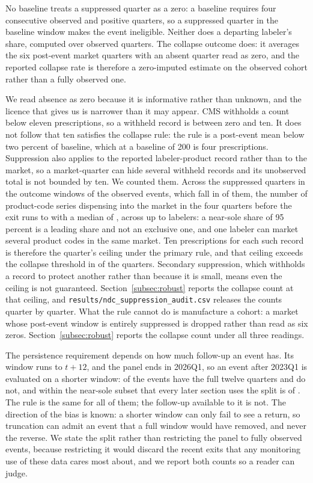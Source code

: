 \documentclass[pdflatex,sn-vancouver-num,Numbered]{sn-jnl}
\begin{document}
No baseline treats a suppressed quarter as a zero: a baseline requires four consecutive observed
and positive quarters, so a suppressed quarter in the baseline window makes the event
ineligible. Neither does a departing labeler's share, computed over observed quarters. The
collapse outcome does: it averages the six post-event market quarters with an absent quarter read
as zero, and the reported collapse rate is therefore a zero-imputed estimate on the observed
cohort rather than a fully observed one.

We read absence as zero because it is informative rather than unknown, and the licence that gives
us is narrower than it may appear. CMS withholds a count below eleven prescriptions, so a
withheld record is between zero and ten. It does not follow that ten satisfies the collapse rule:
the rule is a post-event mean below two percent of baseline, which at a baseline of 200 is four
prescriptions. Suppression also applies to the reported labeler-product record rather than to the
market, so a market-quarter can hide several withheld records and its unobserved total is not
bounded by ten. We counted them. Across the \nSuppQuarters suppressed quarters in the outcome
windows of the \nCauseTotal observed events, which fall in \nSuppEvents of them, the number of
product-code series dispensing into the market in the four quarters before the exit runs to
\nSuppCellsMax with a median of \nSuppCellsMed, across up to \nSuppLabsMax labelers: a near-sole
share of 95 percent is a leading share and not an exclusive one, and one labeler can market
several product codes in the same market. Ten prescriptions for each such record is therefore the
quarter's ceiling under the primary rule, and that ceiling exceeds the collapse threshold in
\nSuppAboveThresh of the \nSuppQuarters quarters. Secondary suppression, which withholds a record
to protect another rather than because it is small, means even the ceiling is not guaranteed.
Section~\ref{subsec:robust} reports the collapse count at that ceiling, and
\texttt{results/ndc\_suppression\_audit.csv} releases the counts quarter by quarter. What the rule cannot do is manufacture a
cohort: a market whose post-event window is entirely suppressed is dropped rather than read as
six zeros. Section~\ref{subsec:robust} reports the collapse count under all three readings.

The persistence requirement depends on how much follow-up an event has. Its window runs to
$t+12$, and the panel ends in 2026Q1, so an event after 2023Q1 is evaluated on a shorter window:
\nPwFull of the \nPwEvents events have the full twelve quarters and \nPwTrunc do not, and within
the near-sole subset that every later section uses the split is \nPwNsFull of \nPwNsEvents. The
rule is the same for all of them; the follow-up available to it is not. The direction of the bias
is known: a shorter window can only fail to see a return, so truncation can admit an event that
a full window would have removed, and never the reverse. We state the split rather than
restricting the panel to fully observed events, because restricting it would discard the recent
exits that any monitoring use of these data cares most about, and we report both counts so a
reader can judge.
\end{document}
